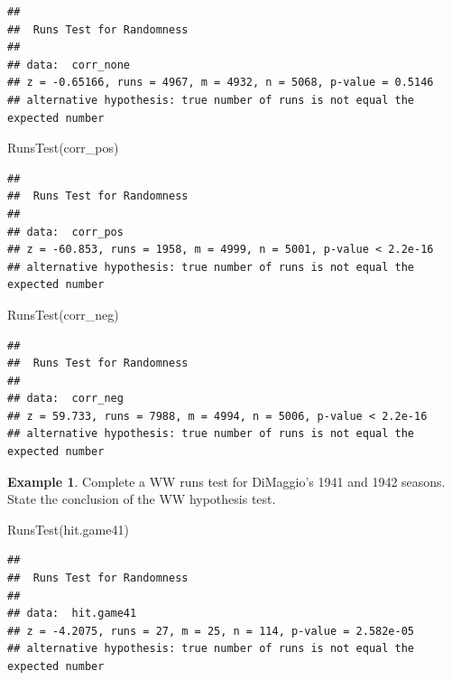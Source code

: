 \documentclass[
  11pt,
]{book}
\newenvironment{Shaded}{\begin{snugshade}}{\end{snugshade}}
\newcommand{\FunctionTok}[1]{\textcolor[rgb]{0.00,0.00,0.00}{#1}}
\newcommand{\NormalTok}[1]{#1}
\theoremstyle{definition}
\theoremstyle{definition}
\newtheorem{example}{Example}[chapter]
\theoremstyle{definition}
\theoremstyle{definition}
\theoremstyle{remark}
\begin{document}
\begin{verbatim}
## 
##  Runs Test for Randomness
## 
## data:  corr_none
## z = -0.65166, runs = 4967, m = 4932, n = 5068, p-value = 0.5146
## alternative hypothesis: true number of runs is not equal the expected number
\end{verbatim}

\vfill

\begin{Shaded}
\begin{Highlighting}[]
\FunctionTok{RunsTest}\NormalTok{(corr\_pos)}
\end{Highlighting}
\end{Shaded}

\begin{verbatim}
## 
##  Runs Test for Randomness
## 
## data:  corr_pos
## z = -60.853, runs = 1958, m = 4999, n = 5001, p-value < 2.2e-16
## alternative hypothesis: true number of runs is not equal the expected number
\end{verbatim}

\vfill

\begin{Shaded}
\begin{Highlighting}[]
\FunctionTok{RunsTest}\NormalTok{(corr\_neg)}
\end{Highlighting}
\end{Shaded}

\begin{verbatim}
## 
##  Runs Test for Randomness
## 
## data:  corr_neg
## z = 59.733, runs = 7988, m = 4994, n = 5006, p-value < 2.2e-16
## alternative hypothesis: true number of runs is not equal the expected number
\end{verbatim}

\newpage

\begin{example}
Complete a WW runs test for DiMaggio's 1941 and 1942 seasons. State the conclusion of the WW hypothesis test.
\end{example}

\begin{Shaded}
\begin{Highlighting}[]
\FunctionTok{RunsTest}\NormalTok{(hit.game41)}
\end{Highlighting}
\end{Shaded}

\begin{verbatim}
## 
##  Runs Test for Randomness
## 
## data:  hit.game41
## z = -4.2075, runs = 27, m = 25, n = 114, p-value = 2.582e-05
## alternative hypothesis: true number of runs is not equal the expected number
\end{verbatim}
\end{document}

